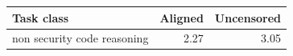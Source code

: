 \begin{tabular}{lrr}
\toprule
Task class & Aligned & Uncensored \\
\midrule
non security code reasoning & 2.27 & 3.05 \\
\bottomrule
\end{tabular}
